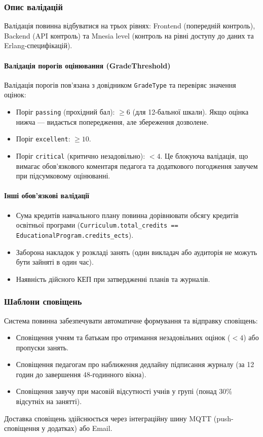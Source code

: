 \documentclass{article}
\begin{document}
\subsubsection{Опис валідацій}
Валідація повинна відбуватися на трьох рівнях: Frontend (попередній контроль), Backend (API контроль) та Mnesia level (контроль на рівні доступу до даних та Erlang-специфікацій).

\paragraph{Валідація порогів оцінювання (GradeThreshold)}
Валідація порогів пов'язана з довідником \texttt{GradeType} та перевіряє значення оцінок:
\begin{itemize}
    \item Поріг \texttt{passing} (прохідний бал): $\ge 6$ (для 12-бальної шкали). Якщо оцінка нижча --- видається попередження, але збереження дозволене.
    \item Поріг \texttt{excellent}: $\ge 10$.
    \item Поріг \texttt{critical} (критично незадовільно): $< 4$. Це блокуюча валідація, що вимагає обов'язкового коментаря педагога та додаткового погодження завучем при підсумковому оцінюванні.
\end{itemize}

\paragraph{Інші обов'язкові валідації}
\begin{itemize}
    \item Сума кредитів навчального плану повинна дорівнювати обсягу кредитів освітньої програми (\texttt{Curriculum.total\_credits == EducationalProgram.credits\_ects}).
    \item Заборона накладок у розкладі занять (один викладач або аудиторія не можуть бути зайняті в один час).
    \item Наявність дійсного КЕП при затвердженні планів та журналів.
\end{itemize}

\subsubsection{Шаблони сповіщень}
Система повинна забезпечувати автоматичне формування та відправку сповіщень:
\begin{itemize}
    \item Сповіщення учням та батькам про отримання незадовільних оцінок ($< 4$) або пропуски занять.
    \item Сповіщення педагогам про наближення дедлайну підписання журналу (за 12 годин до завершення 48-годинного вікна).
    \item Сповіщення завучу при масовій відсутності учнів у групі (понад 30\% відсутніх на занятті).
\end{itemize}
Доставка сповіщень здійснюється через інтеграційну шину MQTT (push-сповіщення у додатках) або Email.
\end{document}

